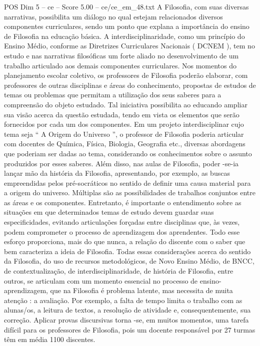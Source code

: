 \begin{textsample}{POS Dim 5 – ce – Score 5.00 – ce/ce\_em\_48.txt}
A Filosofia, com suas diversas narrativas, possibilita um diálogo no qual estejam relacionados diversos componentes curriculares, sendo um ponto que explana a importância do ensino de Filosofia na educação básica.
A interdisciplinaridade, como um princípio do Ensino Médio, conforme as Diretrizes Curriculares Nacionais ( DCNEM ), tem no estudo e nas narrativas filosóficas um forte aliado no desenvolvimento de um trabalho articulado aos demais componentes curriculares.
Nos momentos do planejamento escolar coletivo, os professores de Filosofia poderão elaborar, com professores de outras disciplinas e áreas do conhecimento, propostas de estudos de temas ou problemas que permitam a utilização dos seus saberes para a compreensão do objeto estudado.
Tal iniciativa possibilita ao educando ampliar sua visão acerca da questão estudada, tendo em vista os elementos que serão fornecidos por cada um dos componentes.
Em um projeto interdisciplinar cujo tema seja “ A Origem do Universo ”, o professor de Filosofia poderia articular com docentes de Química, Física, Biologia, Geografia etc., diversas abordagens que poderiam ser dadas ao tema, considerando os conhecimentos sobre o assunto produzidos por esses saberes.
Além disso, nas aulas de Filosofia, poder -se-ia lançar mão da história da Filosofia, apresentando, por exemplo, as buscas empreendidas pelos pré-socráticos no sentido de definir uma causa material para a origem do universo.
Múltiplas são as possibilidades de trabalhos conjuntos entre as áreas e os componentes.
Entretanto, é importante o entendimento sobre as situações em que determinados temas de estudo devem guardar suas especificidades, evitando articulações forçadas entre disciplinas que, às vezes, podem comprometer o processo de aprendizagem dos aprendentes.
Todo esse esforço proporciona, mais do que nunca, a relação do discente com o saber que bem caracteriza a ideia de Filosofia.
Todas essas considerações acerca do sentido da Filosofia, do uso de recursos metodológicos, de Novo Ensino Médio, de BNCC, de contextualização, de interdisciplinaridade, de história de Filosofia, entre outros, se articulam com um momento essencial no processo de ensino-aprendizagem, que na Filosofia é problema latente, mas necessita de muita atenção : a avaliação.
Por exemplo, a falta de tempo limita o trabalho com as alunas/os, a leitura de textos, a resolução de atividade e, consequentemente, sua correção.
Aplicar provas discursivas torna -se, em muitos momentos, uma tarefa difícil para os professores de Filosofia, pois um docente responsável por 27 turmas têm em média 1100 discentes.

\end{textsample}
